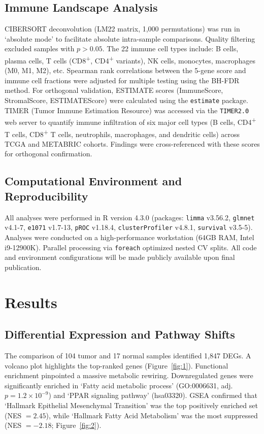 \documentclass[a4paper,fleqn]{cas-dc}
\begin{document}
\subsection{Immune Landscape Analysis}\label{sec:immune}
CIBERSORT deconvolution (LM22 matrix, 1,000 permutations) was run in `absolute mode' to facilitate absolute intra-sample comparisons. Quality filtering excluded samples with $p > 0.05$. The 22 immune cell types include: B cells, plasma cells, T cells (CD8\textsuperscript{+}, CD4\textsuperscript{+} variants), NK cells, monocytes, macrophages (M0, M1, M2), etc. Spearman rank correlations between the 5-gene score and immune cell fractions were adjusted for multiple testing using the BH-FDR method. For orthogonal validation, ESTIMATE scores (ImmuneScore, StromalScore, ESTIMATEScore) were calculated using the \texttt{estimate} package. TIMER (Tumor Immune Estimation Resource) was accessed via the \texttt{TIMER2.0} web server to quantify immune infiltration of six major cell types (B cells, CD4\textsuperscript{+} T cells, CD8\textsuperscript{+} T cells, neutrophils, macrophages, and dendritic cells) across TCGA and METABRIC cohorts. Findings were cross-referenced with these scores for orthogonal confirmation.

\subsection{Computational Environment and Reproducibility}\label{sec:environment}
All analyses were performed in R version 4.3.0 (packages: \texttt{limma} v3.56.2, \texttt{glmnet} v4.1-7, \texttt{e1071} v1.7-13, \texttt{pROC} v1.18.4, \texttt{clusterProfiler} v4.8.1, \texttt{survival} v3.5-5). Analyses were conducted on a high-performance workstation (64GB RAM, Intel i9-12900K). Parallel processing via \texttt{foreach} optimized nested CV splits. All code and environment configurations will be made publicly available upon final publication.

\section{Results}\label{sec:results}

\subsection{Differential Expression and Pathway Shifts}\label{sec:deg-results}
The comparison of 104 tumor and 17 normal samples identified 1,847 DEGs. A volcano plot highlights the top-ranked genes (Figure~\ref{fig:1}). Functional enrichment pinpointed a massive metabolic rewiring. Downregulated genes were significantly enriched in `Fatty acid metabolic process' (GO:0006631, adj.\ $p = 1.2\times10^{-9}$) and `PPAR signaling pathway' (hsa03320). GSEA confirmed that `Hallmark Epithelial Mesenchymal Transition' was the top positively enriched set (NES $= 2.45$), while `Hallmark Fatty Acid Metabolism' was the most suppressed (NES $= -2.18$; Figure~\ref{fig:2}).
\end{document}
